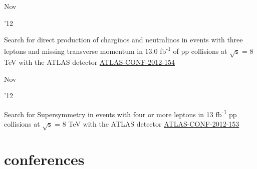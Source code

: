 \documentclass[]{cv} %
\begin{document}
\begin{entrylist}
    \entry
    {\parbox[t]{\parboxWidthOne}{Nov}\parbox[t]{\parboxWidthTwo}{\hfill '12}}
    {Search for direct production of charginos and neutralinos in events with three leptons and missing transverse momentum in 13.0
      fb\textsuperscript{-1} of pp collisions at $\sqrt{\mathsf{s}}$ = 8 TeV with the ATLAS detector}
      {\href{https://cds.cern.ch/record/1493493}{ATLAS-CONF-2012-154}}
      {\vspace*{\spacingPubs}}

      \entry
      {\parbox[t]{\parboxWidthOne}{Nov}\parbox[t]{\parboxWidthTwo}{\hfill '12}}
      {Search for Supersymmetry in events with four or more leptons in 13 fb\textsuperscript{-1} pp collisions at $\sqrt{\mathsf{s}}$
    = 8 TeV with the ATLAS detector}
    {\href{https://cds.cern.ch/record/1493492}{ATLAS-CONF-2012-153}}
    {\vspace*{\spacingPubs}}

\end{entrylist}

\newpage

\section{conferences}
\end{document}
